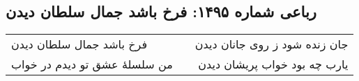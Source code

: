 \begin{center}
\section*{رباعی شماره ۱۴۹۵: فرخ باشد جمال سلطان دیدن}
\label{sec:1495}
\begin{longtable}{l p{0.5cm} r}
فرخ باشد جمال سلطان دیدن
&&
جان زنده شود ز روی جانان دیدن
\\
من سلسلهٔ عشق تو دیدم در خواب
&&
یارب چه بود خواب پریشان دیدن
\\
\end{longtable}
\end{center}
